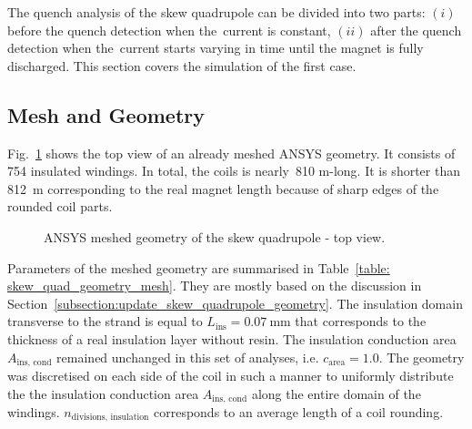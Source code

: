 
The quench analysis of the skew quadrupole can be divided into two parts: $(i)$ before the quench detection when the~current is constant, $(ii)$ after the quench detection when the~current starts varying in time until the magnet is fully discharged. This section covers the simulation of the first case. 

\subsection{Mesh and Geometry}

Fig.~\ref{fig:skew_quad_ansys_top_view} shows the top view of an already meshed ANSYS geometry. It consists of 754 insulated windings. In total, the coils is nearly~810 m-long. It is shorter than 812~m corresponding to the real magnet length because of sharp edges of the rounded coil parts. 

\begin{figure}[H]
    \centering
    \caption{ANSYS meshed geometry of the skew quadrupole - top view.}
    \label{fig:skew_quad_ansys_top_view}
\end{figure}

Parameters of the meshed geometry are summarised in Table~\ref{table: skew_quad_geometry_mesh}. They are mostly based on the discussion in Section~\ref{subsection:update_skew_quadrupole_geometry}. The insulation domain transverse to the strand is equal to $L_\text{ins}=0.07~\text{mm}$ that corresponds to the thickness of a real insulation layer without resin. The insulation conduction area $A_\text{ins, cond}$ remained unchanged in this set of analyses, i.e. $c_\text{area}=1.0$. The geometry was discretised on each side of the coil in such a manner to uniformly distribute the the insulation conduction area $A_\text{ins, cond}$ along the entire domain of the windings. $n_\text{divisions, insulation}$ corresponds to an average length of a coil rounding. 

